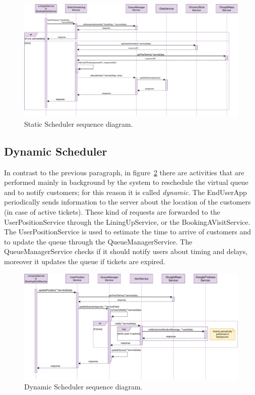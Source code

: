 \begin{figure}[H]
	\centering
	\includegraphics[width=1.0\textwidth]{images/scheduler_sequence_diagram.pdf}
	\caption{Static Scheduler sequence diagram.}\label{fig:StaticScheduler}
\end{figure}

\subsection{Dynamic Scheduler}

In contrast to the previous paragraph, in figure~\ref{fig:DynamicScheduler} there are activities that are performed mainly in background by the system to reschedule the virtual queue and to notify customers; for this reason it is called \textit{dynamic}.
The EndUserApp periodically sends information to the server about the location of the customers (in case of active tickets). These kind of requests are forwarded to the UserPositionService through the LiningUpService, or the BookingAVisitService. The UserPositionService is used to estimate the time to arrive of customers and to update the queue through the QueueManagerService.
The QueueManagerService checks if it should notify users about timing and delays, moreover it updates the queue if tickets are expired.

\begin{figure}[H]
	\centering
	\includegraphics[width=1.0\textwidth]{images/dynamicScheduler_sequence_diagram.pdf}
	\caption{Dynamic Scheduler sequence diagram.}\label{fig:DynamicScheduler}
\end{figure}

